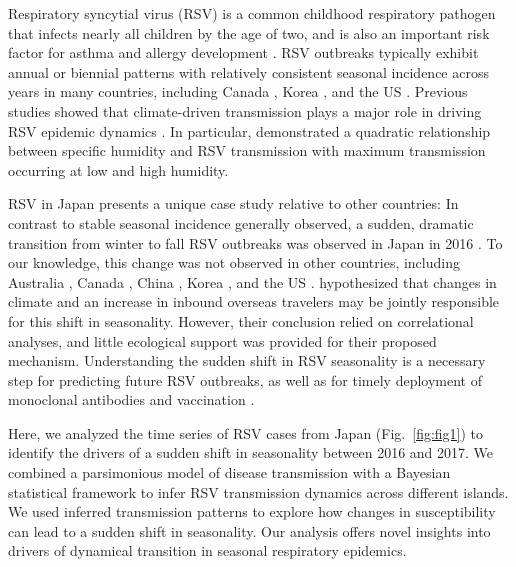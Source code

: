 \documentclass[12pt]{article}
\newcommand{\fref}[1]{Fig.~\ref{fig:#1}}
\begin{document}
Respiratory syncytial virus (RSV) is a common childhood respiratory pathogen that infects nearly all children by the age of two, and is also an important risk factor for asthma and allergy development \citep{sigurs1995asthma,sigurs2010asthma,edwards2012microbiology}.
RSV outbreaks typically exhibit annual or biennial patterns with relatively consistent seasonal incidence across years in many countries, including Canada \citep{paramo2023respiratory}, Korea \citep{kim2020investigation}, and the US \citep{pitzer2015environmental,baker2019epidemic}.
Previous studies showed that climate-driven transmission plays a major role in driving RSV epidemic dynamics \citep{pitzer2015environmental,baker2019epidemic}.
In particular, \cite{baker2019epidemic} demonstrated a quadratic relationship between specific humidity and RSV transmission with maximum transmission occurring at low and high humidity.

RSV in Japan presents a unique case study relative to other countries: In contrast to stable seasonal incidence generally observed, a sudden, dramatic transition from winter to fall RSV outbreaks was observed in Japan in 2016 \citep{miyama2021seasonal,wagatsuma2021shifts}.
To our knowledge, this change was not observed in other countries, including Australia \citep{nazareno2022modelled}, Canada \citep{canada-report}, China \citep{luo2022comparison,li2023defining,li2024characterising}, Korea \citep{kim2023molecular}, and the US \citep{rose2018respiratory,hansen2022mortality}.
\cite{wagatsuma2021shifts} hypothesized that changes in climate and an increase in inbound overseas travelers may be jointly responsible for this shift in seasonality.
However, their conclusion relied on correlational analyses, and little ecological support was provided for their proposed mechanism.
Understanding the sudden shift in RSV seasonality is a necessary step for predicting future RSV outbreaks, as well as for timely deployment of monoclonal antibodies and vaccination \citep{mazur2023respiratory}.

Here, we analyzed the time series of RSV cases from Japan (\fref{fig1}) to identify the drivers of a sudden shift in seasonality between 2016 and 2017. 
We combined a parsimonious model of disease transmission with a Bayesian statistical framework to infer RSV transmission dynamics across different islands.
We used inferred transmission patterns to explore how changes in susceptibility can lead to a sudden shift in seasonality.
Our analysis offers novel insights into drivers of dynamical transition in seasonal respiratory epidemics.
\end{document}
